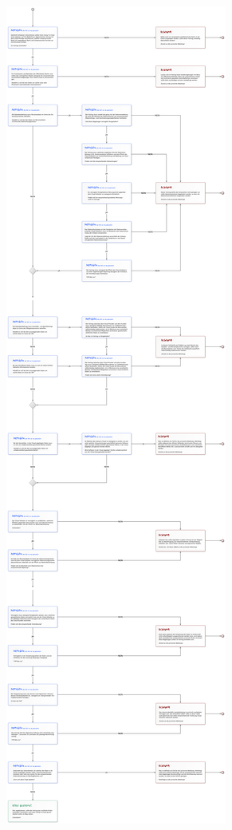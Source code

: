 \documentclass[a4paper,pointlessnumbers]{scrreprt}
\begin{document}
\begin{center}
\includegraphics[width=\textwidth]{images/flussdiagramm02.pdf}

\end{center}
\end{document}
